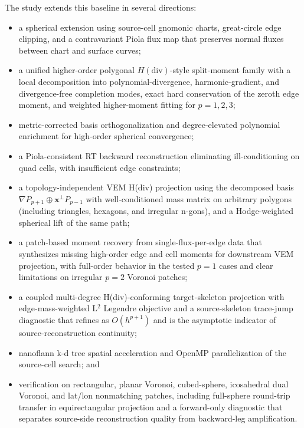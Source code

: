 \documentclass[11pt]{article}
\begin{document}
The study extends this baseline in several directions:
\begin{itemize}
  \item a spherical extension using source-cell gnomonic charts, great-circle
        edge clipping, and a contravariant Piola flux map that preserves normal
        fluxes between chart and surface curves;
  \item a unified higher-order polygonal $H(\mathrm{div})$-style split-moment
        family with a local decomposition into polynomial-divergence,
        harmonic-gradient, and divergence-free completion modes, exact hard
        conservation of the zeroth edge moment, and weighted higher-moment
        fitting for $p=1,2,3$;
  \item metric-corrected basis orthogonalization and degree-elevated
        polynomial enrichment for high-order spherical convergence;
  \item a Piola-consistent RT backward reconstruction eliminating ill-conditioning on quad cells,
        with insufficient edge constraints;
  \item a topology-independent VEM H(div) projection using the decomposed
        basis $\nabla P_{p+1}\oplus\mathbf{x}^{\perp}P_{p-1}$ with
        well-conditioned mass matrix on arbitrary polygons (including
        triangles, hexagons, and irregular n-gons), and a Hodge-weighted
        spherical lift of the same path;
  \item a patch-based moment recovery from single-flux-per-edge data
        that synthesizes missing high-order edge and cell moments for
        downstream VEM projection, with full-order behavior in the tested
        \(p=1\) cases and clear limitations on irregular \(p=2\) Voronoi
        patches;
  \item a coupled multi-degree H(div)-conforming target-skeleton
        projection with edge-mass-weighted L\(^2\) Legendre objective and
        a source-skeleton trace-jump diagnostic that refines as
        \(O(h^{p+1})\) and is the asymptotic indicator of
        source-reconstruction continuity;
  \item nanoflann k-d tree spatial acceleration and OpenMP parallelization
        of the source-cell search; and
  \item verification on rectangular, planar Voronoi, cubed-sphere,
        icosahedral dual Voronoi, and lat/lon nonmatching patches, including
        full-sphere round-trip transfer in equirectangular projection and
        a forward-only diagnostic that separates source-side reconstruction
        quality from backward-leg amplification.
\end{itemize}
\end{document}
